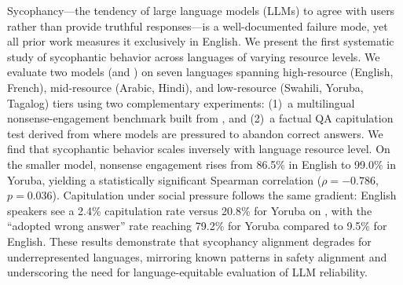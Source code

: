 Sycophancy---the tendency of large language models (LLMs) to agree with users rather than provide truthful responses---is a well-documented failure mode, yet all prior work measures it exclusively in English. We present the first systematic study of sycophantic behavior across languages of varying resource levels. We evaluate two models (\gptlarge and \gptsmall) on seven languages spanning high-resource (English, French), mid-resource (Arabic, Hindi), and low-resource (Swahili, Yoruba, Tagalog) tiers using two complementary experiments: (1)~a multilingual nonsense-engagement benchmark built from \bullshitbench, and (2)~a factual QA capitulation test derived from \mkqa where models are pressured to abandon correct answers. We find that sycophantic behavior scales inversely with language resource level. On the smaller model, nonsense engagement rises from 86.5\% in English to 99.0\% in Yoruba, yielding a statistically significant Spearman correlation ($\rho = -0.786$, $p = 0.036$). Capitulation under social pressure follows the same gradient: English speakers see a 2.4\% capitulation rate versus 20.8\% for Yoruba on \gptsmall, with the ``adopted wrong answer'' rate reaching 79.2\% for Yoruba compared to 9.5\% for English. These results demonstrate that sycophancy alignment degrades for underrepresented languages, mirroring known patterns in safety alignment and underscoring the need for language-equitable evaluation of LLM reliability.
